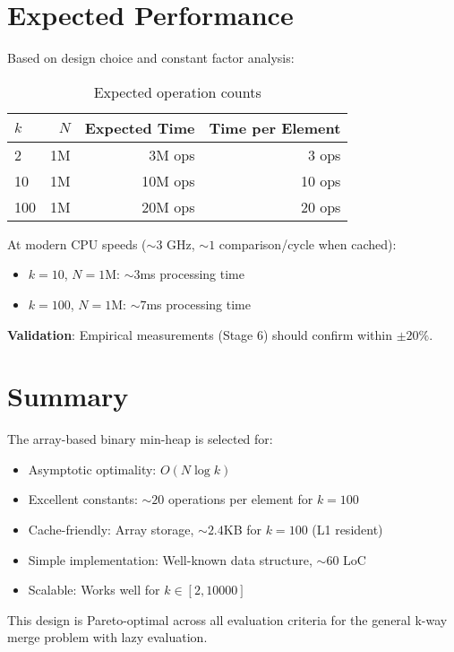 \documentclass[11pt]{article}
\begin{document}
\section{Expected Performance}

Based on design choice and constant factor analysis:

\begin{table}[h]
\centering
\begin{tabular}{lrrr}
\hline
$k$ & $N$ & Expected Time & Time per Element \\ \hline
2   & 1M  & 3M ops        & 3 ops            \\
10  & 1M  & 10M ops       & 10 ops           \\
100 & 1M  & 20M ops       & 20 ops           \\
\hline
\end{tabular}
\caption{Expected operation counts}
\end{table}

At modern CPU speeds ($\sim 3$ GHz, $\sim 1$ comparison/cycle when cached):
\begin{itemize}
    \item $k = 10$, $N = 1$M: $\sim 3$ms processing time
    \item $k = 100$, $N = 1$M: $\sim 7$ms processing time
\end{itemize}

\textbf{Validation}: Empirical measurements (Stage 6) should confirm within $\pm 20\%$.

\section{Summary}

The array-based binary min-heap is selected for:
\begin{itemize}
    \item Asymptotic optimality: $O(N \log k)$
    \item Excellent constants: $\sim 20$ operations per element for $k = 100$
    \item Cache-friendly: Array storage, $\sim 2.4$KB for $k = 100$ (L1 resident)
    \item Simple implementation: Well-known data structure, $\sim 60$ LoC
    \item Scalable: Works well for $k \in [2, 10000]$
\end{itemize}

This design is Pareto-optimal across all evaluation criteria for the general k-way merge problem with lazy evaluation.
\end{document}
